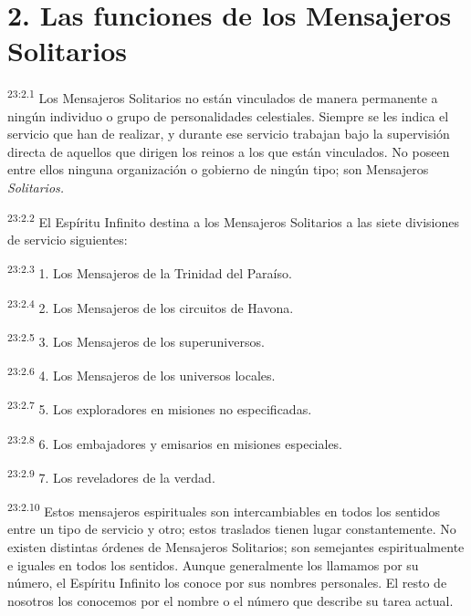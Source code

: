 \section*{2. Las funciones de los Mensajeros Solitarios}
\par
\textsuperscript{23:2.1} Los Mensajeros Solitarios no están vinculados de manera permanente a ningún individuo o grupo de personalidades celestiales. Siempre se les indica el servicio que han de realizar, y durante ese servicio trabajan bajo la supervisión directa de aquellos que dirigen los reinos a los que están vinculados. No poseen entre ellos ninguna organización o gobierno de ningún tipo; son Mensajeros \textit{Solitarios.}

\par
\textsuperscript{23:2.2} El Espíritu Infinito destina a los Mensajeros Solitarios a las siete divisiones de servicio siguientes:

\par
\textsuperscript{23:2.3} 1. Los Mensajeros de la Trinidad del Paraíso.

\par
\textsuperscript{23:2.4} 2. Los Mensajeros de los circuitos de Havona.

\par
\textsuperscript{23:2.5} 3. Los Mensajeros de los superuniversos.

\par
\textsuperscript{23:2.6} 4. Los Mensajeros de los universos locales.

\par
\textsuperscript{23:2.7} 5. Los exploradores en misiones no especificadas.

\par
\textsuperscript{23:2.8} 6. Los embajadores y emisarios en misiones especiales.

\par
\textsuperscript{23:2.9} 7. Los reveladores de la verdad.

\par
\textsuperscript{23:2.10} Estos mensajeros espirituales son intercambiables en todos los sentidos entre un tipo de servicio y otro; estos traslados tienen lugar constantemente. No existen distintas órdenes de Mensajeros Solitarios; son semejantes espiritualmente e iguales en todos los sentidos. Aunque generalmente los llamamos por su número, el Espíritu Infinito los conoce por sus nombres personales. El resto de nosotros los conocemos por el nombre o el número que describe su tarea actual.

